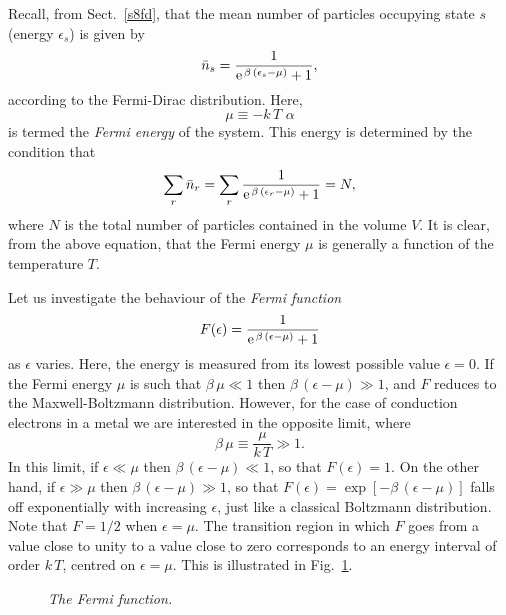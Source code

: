 Recall, from Sect.~\ref{s8fd}, that the mean number of particles occupying
state $s$ (energy $\epsilon_s$) is given by
\begin{equation}
\bar{n}_s = \frac{1}{{\rm e}^{\,\beta\,(\epsilon_s-\mu)} + 1},
\end{equation}
according to the Fermi-Dirac distribution. Here,
\begin{equation}
\mu \equiv -k\,T\,\,\alpha
\end{equation}
is termed the {\em Fermi energy}\/ of the system. This energy is
determined by the condition that
\begin{equation}
\sum_r \bar{n}_r = \sum_r\frac{1}{{\rm e}^{\,\beta\,(\epsilon_r-\mu)} + 1}
=N,
\end{equation}
where $N$ is the total number of particles contained in the volume $V$. 
It is clear, from the above equation, that the Fermi energy $\mu$  is generally
a function of the temperature $T$.

Let us investigate the behaviour of the {\em Fermi function}
\begin{equation}
F(\epsilon) = \frac{1}{{\rm e}^{\,\beta\,(\epsilon-\mu)} + 1}
\end{equation}
as $\epsilon$ varies. Here, the energy is measured from
its lowest possible value $\epsilon=0$. If the Fermi energy $\mu$ is
such that $\beta\,\mu\ll 1$ then $\beta\,(\epsilon-\mu)\gg 1$,
and $F$ reduces to the Maxwell-Boltzmann distribution. However,
for the case of conduction electrons in a metal we are interested in
the opposite limit, where 
\begin{equation}
\beta\,\mu \equiv \frac{\mu}{k\,T} \gg 1.
\end{equation}
In this limit, if $\epsilon\ll \mu$ then $\beta\,(\epsilon-\mu)\ll 1$,
so that $F(\epsilon)=1$. On the other hand, if $\epsilon\gg \mu$ then
$\beta\,(\epsilon-\mu)\gg 1$, so that $F(\epsilon)= 
\exp[-\beta\,(\epsilon-\mu)]$ falls off exponentially with increasing
$\epsilon$, just like a classical Boltzmann distribution. Note that
$F=1/2$ when $\epsilon=\mu$. The transition region in which $F$ goes from 
a value close to unity to a value close to zero corresponds to an
energy interval of order $k\,T$, centred on $\epsilon=\mu$. This is
illustrated in Fig.~\ref{ffermi}.

\begin{figure}
\epsfysize=3in
\centerline{}
\caption{\em The Fermi function.}\label{ffermi}
\end{figure}

